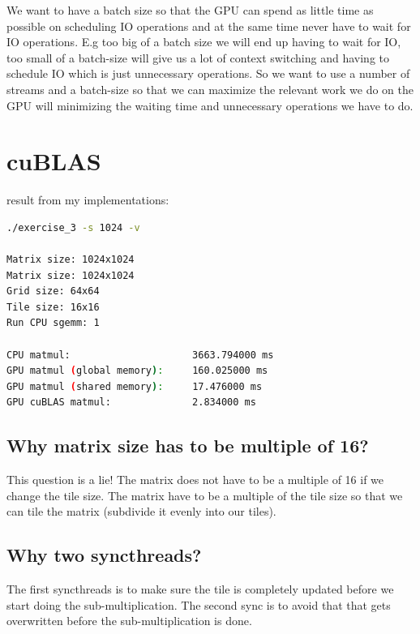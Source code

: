 \documentclass{article}
\begin{document}
We want to have a batch size so that the GPU can spend as little time as possible on scheduling IO operations and at the same time never have to wait for IO operations. E.g too big of a batch size we will end up having to
wait for IO, too small of a batch-size will give us a lot of context switching and having to schedule IO which is just unnecessary operations. So we want to use a number of streams and a batch-size so that we can maximize
the relevant work we do on the GPU will minimizing the waiting time and unnecessary operations we have to do.


\section{cuBLAS}%
\label{sec:cublas}

result from my implementations: 


\begin{mdframed}[backgroundcolor=codeColor,leftmargin=0.0cm,hidealllines=true,%
  innerleftmargin=0.1cm,innerrightmargin=0.1cm,innertopmargin=0.5cm,innerbottommargin=0.10cm,
  roundcorner=15pt]
\begin{lstlisting}[language=bash]
./exercise_3 -s 1024 -v

Matrix size: 1024x1024
Matrix size: 1024x1024
Grid size: 64x64
Tile size: 16x16
Run CPU sgemm: 1

CPU matmul:                     3663.794000 ms
GPU matmul (global memory):     160.025000 ms
GPU matmul (shared memory):     17.476000 ms
GPU cuBLAS matmul:              2.834000 ms
\end{lstlisting}
\end{mdframed}


\subsection{Why matrix size has to be multiple of 16?}%
\label{sub:why_matrix_size_has_t_obe_multiple_of_16}

This question is a lie! The matrix does not have to be a multiple of 16 if we change the tile size. The matrix have to be a multiple of the tile size
so that we can tile the matrix (subdivide it evenly into our tiles).

\subsection{Why two syncthreads?}%

The first syncthreads is to make sure the tile is completely updated before we start doing the sub-multiplication. The second sync is to avoid that that gets overwritten before the sub-multiplication is done.
\end{document}

